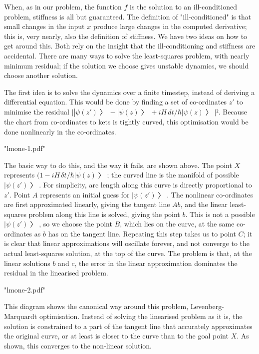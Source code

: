 When, as in our problem, the function $f$ is the solution to an ill-conditioned problem, stiffness is all but guaranteed.  The definition of "ill-conditioned" is that small changes in the input $x$ produce large changes in the computed derivative; this is, very nearly, also the definition of stiffness.  We have two ideas on how to get around this.  Both rely on the insight that the ill-conditioning and stiffness are accidental.  There are many ways to solve the least-squares problem, with nearly minimum residual; if the solution we choose gives unstable dynamics, we should choose another solution.


The first idea is to solve the dynamics over a finite timestep, instead of deriving a differential equation.  This would be done by finding a set of co-ordinates $z'$ to minimise the residual $\bigl| |ψ(z')〉-|ψ(z)〉+iH\,dt/\hbar|ψ(z)〉\bigr|².$  Because the chart from co-ordinates to kets is tightly curved, this optimisation would be done nonlinearly in the co-ordinates.

\centerline{\XeTeXpdffile "lmone-1.pdf"}

The basic way to do this, and the way it fails, are shown above.  The point $X$ represents $(1-iH\,δt/\hbar|ψ(z)〉$; the curved line is the manifold of possible $|ψ(z')〉$.  For simplicity, arc length along this curve is directly proportional to $z'$.  Point $A$ represents an initial guess for $|ψ(z')〉$.  The nonlinear co-ordinates are first approximated linearly, giving the tangent line $Ab$, and the linear least-squares problem along this line is solved, giving the point $b$.  This is not a possible $|ψ(z')〉$, so we choose the point $B$, which lies on the curve, at the same co-ordinates as $b$ has on the tangent line.  Repeating this step takes us to point $C$; it is clear that linear approximations will oscillate forever, and not converge to the actual least-squares solution, at the top of the curve.  The problem is that, at the linear solutions $b$ and $c$, the error in the linear approximation dominates the residual in the linearised problem.

\centerline{\XeTeXpdffile "lmone-2.pdf"}

This diagram shows the canonical way around this problem, Levenberg-Marquardt optimisation.  Instead of solving the linearised problem as it is, the solution is constrained to a part of the tangent line that accurately approximates the original curve, or at least is closer to the curve than to the goal point $X$.  As shown, this converges to the non-linear solution.


